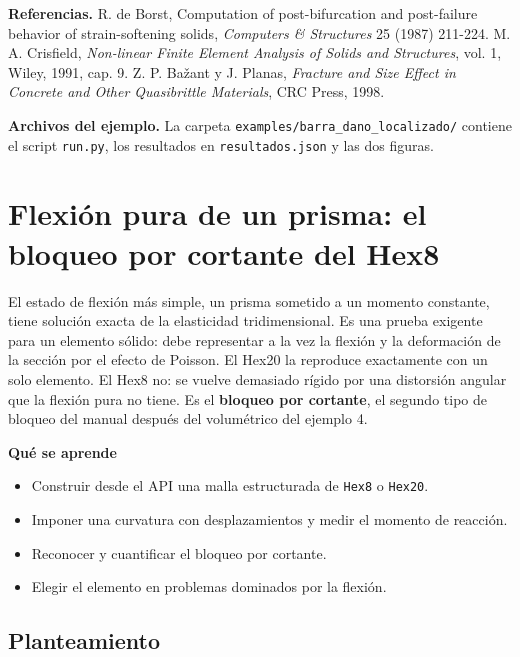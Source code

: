\documentclass[11pt,oneside]{report}
\renewcommand{\chaptermark}[1]{\markboth{Cap.\ \thechapter\ ---\ #1}{}}
\begin{document}
\textbf{Referencias.} R. de Borst, \textquotedbl{}Computation of post-bifurcation and post-failure behavior of strain-softening solids\textquotedbl{}, \textit{Computers \& Structures} 25 (1987) 211-224. M. A. Crisfield, \textit{Non-linear Finite Element Analysis of Solids and Structures}, vol. 1, Wiley, 1991, cap. 9. Z. P. Bažant y J. Planas, \textit{Fracture and Size Effect in Concrete and Other Quasibrittle Materials}, CRC Press, 1998.

\textbf{Archivos del ejemplo.} La carpeta \texttt{examples/\allowbreak{}barra\_\allowbreak{}dano\_\allowbreak{}localizado/\allowbreak{}} contiene el script \texttt{run.py}, los resultados en \texttt{resultados.json} y las dos figuras.


\newpage

\chapter{Flexión pura de un prisma: el bloqueo por cortante del Hex8}
\chaptermark{Flexión pura de un prisma}
\label{cap:flexion_pura_3d}





El estado de flexión más simple, un prisma sometido a un momento constante, tiene solución exacta de la elasticidad tridimensional. Es una prueba exigente para un elemento sólido: debe representar a la vez la flexión y la deformación de la sección por el efecto de Poisson. El Hex20 la reproduce exactamente con un solo elemento. El Hex8 no: se vuelve demasiado rígido por una distorsión angular que la flexión pura no tiene. Es el \textbf{bloqueo por cortante}, el segundo tipo de bloqueo del manual después del volumétrico del ejemplo 4.

\textbf{Qué se aprende}

\begin{itemize}
  \item Construir desde el API una malla estructurada de \texttt{Hex8} o \texttt{Hex20}.
  \item Imponer una curvatura con desplazamientos y medir el momento de reacción.
  \item Reconocer y cuantificar el bloqueo por cortante.
  \item Elegir el elemento en problemas dominados por la flexión.
\end{itemize}

\section{Planteamiento}
\end{document}
